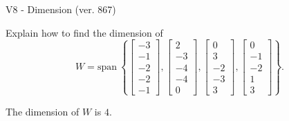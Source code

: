 \begin{exercise}
  \begin{exerciseTitle}V8 - Dimension (ver. 867)\end{exerciseTitle}
  \begin{exerciseStatement}
    Explain how to find the dimension of 
\[W=\mathrm{span}\ \left\{\left[\begin{array}{r}
-3 \\
-1 \\
-2 \\
-2 \\
-1
\end{array}\right] , \left[\begin{array}{r}
2 \\
-3 \\
-4 \\
-4 \\
0
\end{array}\right] , \left[\begin{array}{r}
0 \\
3 \\
-2 \\
-3 \\
3
\end{array}\right] , \left[\begin{array}{r}
0 \\
-1 \\
-2 \\
1 \\
3
\end{array}\right]\right\}.\]



  \end{exerciseStatement}
  \begin{exerciseAnswer}
   The dimension of \(W\) is  \(4\).
  


  \end{exerciseAnswer}
\end{exercise}